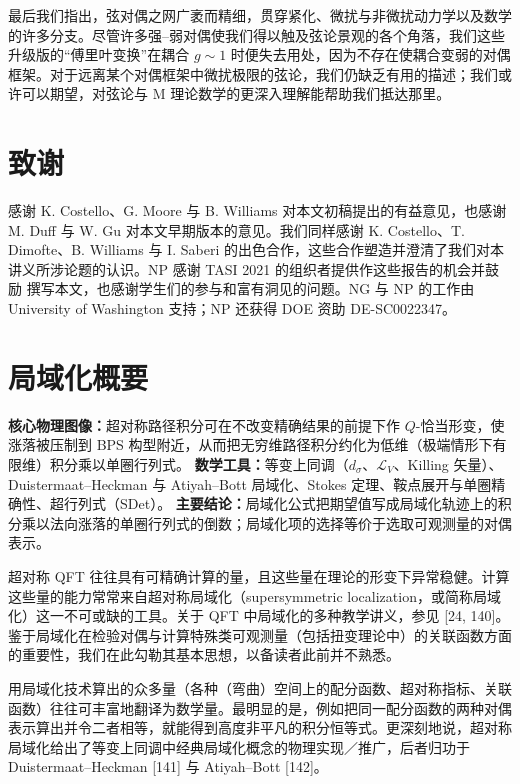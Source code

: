 最后我们指出，弦对偶之网广袤而精细，贯穿紧化、微扰与非微扰动力学以及数学的许多分支。尽管许多强--弱对偶使我们得以触及弦论景观的各个角落，我们这些升级版的“傅里叶变换”在耦合 $g\sim 1$ 时便失去用处，因为不存在使耦合变弱的对偶框架。对于远离某个对偶框架中微扰极限的弦论，我们仍缺乏有用的描述；我们或许可以期望，对弦论与 M 理论数学的更深入理解能帮助我们抵达那里。

\section{致谢}

感谢 K. Costello、G. Moore 与 B. Williams 对本文初稿提出的有益意见，也感谢 M. Duff 与 W. Gu 对本文早期版本的意见。我们同样感谢 K. Costello、T. Dimofte、B. Williams 与 I. Saberi 的出色合作，这些合作塑造并澄清了我们对本讲义所涉论题的认识。NP 感谢 TASI 2021 的组织者提供作这些报告的机会并鼓励
撰写本文，也感谢学生们的参与和富有洞见的问题。NG 与 NP 的工作由 University of Washington 支持；NP 还获得 DOE 资助 DE-SC0022347。

\appendix

\section{局域化概要}

\begin{keytakeaway}
\textbf{核心物理图像：}超对称路径积分可在不改变精确结果的前提下作 $Q$-恰当形变，使涨落被压制到 BPS 构型附近，从而把无穷维路径积分约化为低维（极端情形下有限维）积分乘以单圈行列式。
\textbf{数学工具：}等变上同调（$d_\sigma$、$\mathcal{L}_V$、Killing 矢量）、Duistermaat--Heckman 与 Atiyah--Bott 局域化、Stokes 定理、鞍点展开与单圈精确性、超行列式（SDet）。
\textbf{主要结论：}局域化公式把期望值写成局域化轨迹上的积分乘以法向涨落的单圈行列式的倒数；局域化项的选择等价于选取可观测量的对偶表示。
\end{keytakeaway}

超对称 QFT 往往具有可精确计算的量，且这些量在理论的形变下异常稳健。计算这些量的能力常常来自超对称局域化（supersymmetric localization，或简称局域化）这一不可或缺的工具。关于 QFT 中局域化的多种教学讲义，参见 [24, 140]。鉴于局域化在检验对偶与计算特殊类可观测量（包括扭变理论中）的关联函数方面的重要性，我们在此勾勒其基本思想，以备读者此前并不熟悉。

用局域化技术算出的众多量（各种（弯曲）空间上的配分函数、超对称指标、关联函数）往往可丰富地翻译为数学量。最明显的是，例如把同一配分函数的两种对偶表示算出并令二者相等，就能得到高度非平凡的积分恒等式。更深刻地说，超对称局域化给出了等变上同调中经典局域化概念的物理实现／推广，后者归功于 Duistermaat--Heckman [141] 与 Atiyah--Bott [142]。

